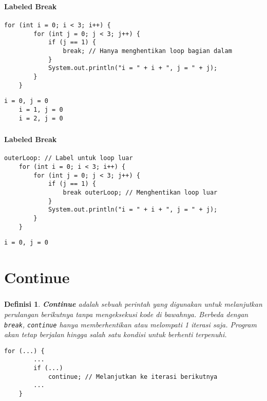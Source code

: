 \documentclass[aspectratio=169]{beamer}
\newtheorem*{definisi}{Definisi}
\theoremstyle{definition}
\begin{document}
    \begin{frame}[fragile]
        \frametitle{\insertsection}
        \framesubtitle{Labeled Break}
        \begin{lstlisting}[firstnumber=70,caption={Non-Labeled Break}]
    for (int i = 0; i < 3; i++) {
        for (int j = 0; j < 3; j++) {
            if (j == 1) {
                break; // Hanya menghentikan loop bagian dalam
            }
            System.out.println("i = " + i + ", j = " + j);
        }
    }
        \end{lstlisting}
        \begin{lstlisting}[style=output]
    i = 0, j = 0
    i = 1, j = 0
    i = 2, j = 0
        \end{lstlisting}
    \end{frame}

    \begin{frame}[fragile]
        \frametitle{\insertsection}
        \framesubtitle{Labeled Break}
        \begin{lstlisting}[firstnumber=83,caption={Labeled Break}]
    outerLoop: // Label untuk loop luar
    for (int i = 0; i < 3; i++) {
        for (int j = 0; j < 3; j++) {
            if (j == 1) {
                break outerLoop; // Menghentikan loop luar
            }
            System.out.println("i = " + i + ", j = " + j);
        }
    }
        \end{lstlisting}
        \begin{lstlisting}[style=output]
    i = 0, j = 0
        \end{lstlisting}
    \end{frame}

    \section{Continue}
    \begin{frame}[fragile]
        \frametitle{\insertsection}
        \begin{definisi}
            \textbf{Continue} adalah sebuah perintah yang digunakan untuk melanjutkan perulangan berikutnya tanpa mengeksekusi kode di bawahnya. Berbeda dengan \texttt{break}, \texttt{continue} hanya memberhentikan atau melompati 1 iterasi saja. Program akan tetap berjalan hingga salah satu kondisi untuk berhenti terpenuhi.
        \end{definisi}
        \begin{lstlisting}[style=standard,firstnumber=59,caption={Contoh penggunaan \texttt{continue} dalam \texttt{for}}]
    for (...) {
        ...
        if (...)
            continue; // Melanjutkan ke iterasi berikutnya
        ...
    }
        \end{lstlisting}
    \end{frame}
\end{document}
